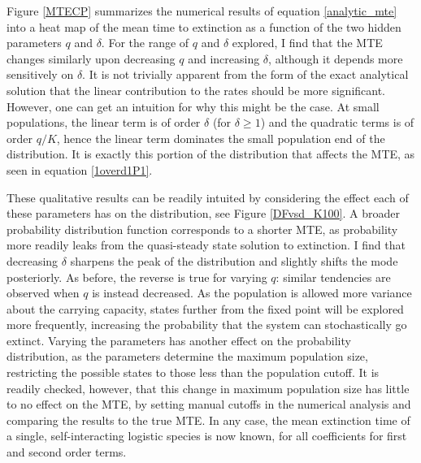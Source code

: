 Figure \ref{MTECP} summarizes the numerical results of equation \ref{analytic_mte} into a heat map of the mean time to extinction as a function of the two hidden parameters $q$ and $\delta$.
For the range of $q$ and $\delta$ explored, I find that the MTE changes similarly upon decreasing $q$ and increasing $\delta$, although it depends more sensitively on $\delta$. 
It is not trivially apparent from the form of the exact analytical solution that the linear contribution to the rates should be more significant. %
However, one can get an intuition for why this might be the case. 
At small populations, the linear term is of order $\delta$ (for $\delta \geq 1$) and the quadratic terms is of order $q/K$, hence the linear term dominates the small population end of the distribution. 
It is exactly this portion of the distribution that affects the MTE, as seen in equation \ref{1overd1P1}. 

These qualitative results can be readily intuited by considering the effect each of these parameters has on the distribution, see Figure \ref{DFvsd_K100}.
A broader probability distribution function corresponds to a shorter MTE, as probability more readily leaks from the quasi-steady state solution to extinction.
I find that decreasing $\delta$ sharpens the peak of the distribution and slightly shifts the mode posteriorly. 
As before, the reverse is true for varying $q$: similar tendencies are observed when $q$ is instead decreased.
As the population is allowed more variance about the carrying capacity, states further from the fixed point will be explored more frequently, increasing the probability that the system can stochastically go extinct. 
Varying the parameters has another effect on the probability distribution, as the parameters determine the maximum population size, restricting the possible states to those less than the population cutoff. 
It is readily checked, however, that this change in maximum population size has little to no effect on the MTE, by setting manual cutoffs in the numerical analysis and comparing the results to the true MTE. 
In any case, the mean extinction time of a single, self-interacting logistic species is now known, for all coefficients for first and second order terms. 

